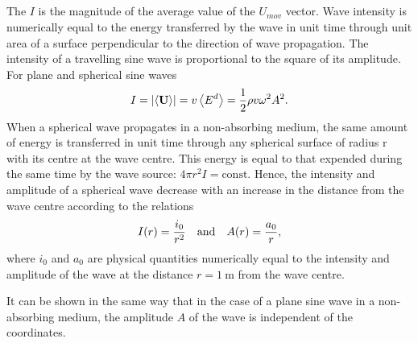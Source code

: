 \subsection{}\label{30.3.6} The  $I$ is the magnitude of the average value of the $U_{mov}$ vector. Wave intensity is numerically equal to the energy transferred by the wave in unit time through unit area of a surface perpendicular to the direction of wave propagation. The intensity of a travelling sine wave is proportional to the square of its amplitude. For plane and spherical sine waves
\begin{equation*}%
I = \abs{\expval{\vb{U}}} = v \expval{E^{d}} = \frac{1}{2} \rho v \omega^{2} A^{2}.
\end{equation*}
When a spherical wave propagates in a non-absorbing medium, the same amount of energy is transferred in unit time through any spherical surface of radius r with its centre at the wave centre. This energy is equal to that expended during the same time by the wave source: $4\pi r^{2}I = \text{const.}$ Hence, the intensity and amplitude of a spherical wave decrease with an increase in the distance from the wave centre according to the relations
\begin{equation*}%
I(r) = \frac{i_{0}}{r^{2}} \qand A(r) = \frac{a_{0}}{r},
\end{equation*}
where $i_{0}$ and $a_{0}$ are physical quantities numerically equal to the intensity and amplitude of the wave at the distance $r = \SI{1}{\meter}$ from the wave centre.

It can be shown in the same way that in the case of a plane sine wave in a non-absorbing medium, the amplitude $A$ of the wave is independent of the coordinates.


